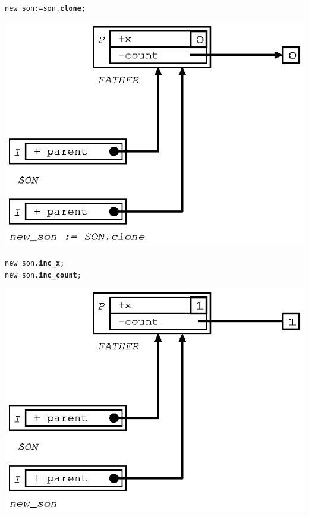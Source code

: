 \documentclass[11pt]{mybook}
\begin{document}
\begin{alltt}
  new\_son := {\sc{}son}.{\bf{}clone};
\end{alltt}
\begin{center}
\includegraphics[scale=1.0]{figures/inherit_plus_1} 
\end{center}

\begin{alltt}
  new\_son.{\bf{}inc\_x};
  new\_son.{\bf{}inc\_count};
\end{alltt}
\begin{center}
\includegraphics[scale=1.0]{figures/inherit_plus_2} 
\end{center}
\end{document}

